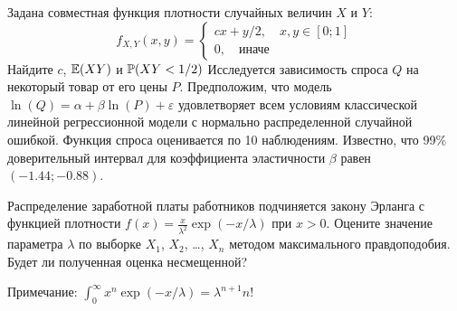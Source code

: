 \documentclass[addpoints, answers]{exam} %
\begin{document}
\begin{questions}
\question Задана совместная функция плотности случайных величин $X$ и $Y$:
\[
f_{X,Y}(x,y)=\left\{\begin{array}{c}
cx+y/2,\quad x,y\in [0;1] \\
0,\quad \text{иначе}
\end{array}  \right.
\]
Найдите $c$, $\E(XY)$ и $\P(XY<1/2)$
\question Исследуется зависимость спроса $Q$ на некоторый товар от его цены $P$. Предположим, что модель $\ln(Q)=\alpha+\beta\ln(P)+\varepsilon$ удовлетворяет всем условиям классической линейной регрессионной модели с нормально распределенной случайной ошибкой. Функция спроса оценивается по 10 наблюдениям. Известно, что 99\% доверительный интервал для коэффициента эластичности $\beta$ равен $(-1.44;-0.88)$.
\question Распределение заработной платы работников подчиняется закону Эрланга с функцией плотности $f(x)=\frac{x}{\lambda^2}\exp(-x/\lambda)$ при $x>0$. Оцените значение параметра $\lambda$ по выборке $X_1$, $X_2$, \ldots, $X_n$ методом максимального правдоподобия. Будет ли полученная оценка несмещенной?

Примечание: $\int_0^{\infty} x^n \exp(-x/\lambda)=\lambda^{n+1}n!$
\end{questions}
\end{document}
